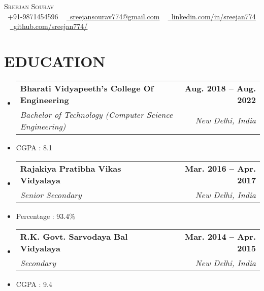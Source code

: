 \documentclass[letterpaper,11pt]{article}
\makeatletter
\newcommand{\resumeItem}[1]{
  \item\small{
    {#1 \vspace{-2pt}}
  }
}
\newcommand{\resumeSubheading}[4]{
  \vspace{-2pt}\item
    \begin{tabular*}{1.0\textwidth}[t]{l@{\extracolsep{\fill}}r}
      \textbf{#1} & \textbf{\small #2} \\
      \textit{\small#3} & \textit{\small #4} \\
    \end{tabular*}\vspace{-7pt}
}
\newcommand{\resumeSubHeadingListStart}{\begin{itemize}[leftmargin=0.0in, label={}]}
\newcommand{\resumeSubHeadingListEnd}{\end{itemize}}
\makeatother
\begin{document}

\begin{center}
    {\Huge \scshape Sreejan Sourav} \\ \vspace{1pt}  \vspace{5mm}
    \small \raisebox{-0.1\height}\faPhone\ +91-9871454596 ~ \href{mailto:sreejansourav774@gmail.com}{\raisebox{-0.2\height}\faEnvelope\  \underline{sreejansourav774@gmail.com}} ~ 
    \href{https://linkedin.com/in/sreejan774/}{\raisebox{-0.2\height}\faLinkedin\ \underline{linkedin.com/in/sreejan774}}  ~
    \href{https://github.com/sreejan774/}{\raisebox{-0.2\height}\faGithub\ \underline{github.com/sreejan774/}}
    \vspace{-8pt}
\end{center}

\vspace{3 mm}
\section{EDUCATION}
  \resumeSubHeadingListStart
    \resumeSubheading
      {Bharati Vidyapeeth's College Of Engineering}{Aug. 2018 -- Aug. 2022}
      {Bachelor of Technology (Computer Science Engineering)}{New Delhi, India}
      \resumeItem{CGPA : 8.1}
  
    \resumeSubheading
      {Rajakiya Pratibha Vikas Vidyalaya}{Mar. 2016 -- Apr. 2017}
      {Senior Secondary}{New Delhi, India} 
      \resumeItem{Percentage : 93.4\%}
    
    \resumeSubheading
      {R.K. Govt. Sarvodaya Bal Vidyalaya}{Mar. 2014 -- Apr. 2015}
      {Secondary}{New Delhi, India}
      \resumeItem{CGPA : 9.4}
  \resumeSubHeadingListEnd
\end{document}
